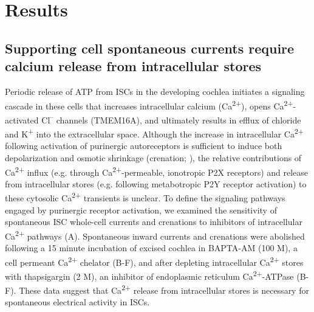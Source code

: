 \documentclass[9pt,lineno]{elife}
\begin{document}
\section{Results}

\subsection{Supporting cell spontaneous currents require calcium release from intracellular stores}
Periodic release of ATP from ISCs in the developing cochlea initiates a signaling cascade in these cells that increases intracellular calcium (Ca\textsuperscript{2+}), opens Ca\textsuperscript{2+}-activated Cl\textsuperscript{–} channels (TMEM16A), and ultimately results in efflux of chloride and K\textsuperscript{+} into the extracellular space. Although the increase in intracellular Ca\textsuperscript{2+} following activation of purinergic autoreceptors is sufficient to induce both depolarization and osmotic shrinkage (crenation; \cite{Wang2015}), the relative contributions of Ca\textsuperscript{2+} influx (e.g. through Ca\textsuperscript{2+}-permeable, ionotropic P2X receptors) and release from intracellular stores (e.g. following metabotropic P2Y receptor activation) to these cytosolic Ca\textsuperscript{2+} transients is unclear. To define the signaling pathways engaged by purinergic receptor activation, we examined the sensitivity of spontaneous ISC whole-cell currents and crenations to inhibitors of intracellular Ca\textsuperscript{2+} pathways (A). Spontaneous inward currents and crenations were abolished following a 15 minute incubation of excised cochlea in BAPTA-AM (100 \textmu M), a cell permeant Ca\textsuperscript{2+} chelator (B-F), and after depleting intracellular Ca\textsuperscript{2+} stores with thapsigargin (2 \textmu M), an inhibitor of endoplasmic reticulum Ca\textsuperscript{2+}-ATPase (B-F). These data suggest that Ca\textsuperscript{2+} release from intracellular stores is necessary for spontaneous electrical activity in ISCs. 
\end{document}
